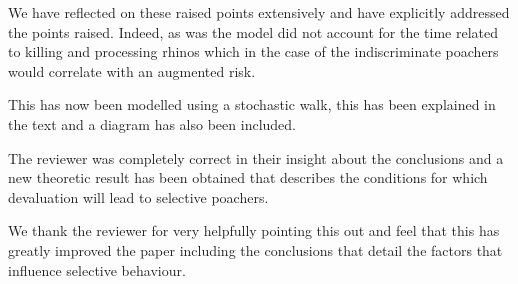 \documentclass[10pt]{article}
\begin{document}
We have reflected on these raised points extensively and have explicitly
addressed the points raised. Indeed, as was the model did not account for the
time related to killing and processing rhinos which in the case of the
indiscriminate poachers would correlate with an augmented risk.

This has now been modelled using a stochastic walk, this has been
explained in the text and a diagram has also been included.

The reviewer was completely correct in their insight about the conclusions and
a new theoretic result has been obtained that describes the conditions for which
devaluation will lead to selective poachers.

We thank the reviewer for very helpfully pointing this out and feel that this
has greatly improved the paper including the conclusions that detail the factors
that influence selective behaviour.
\end{document}
